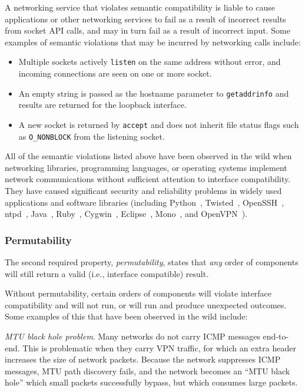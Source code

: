 A networking service that violates semantic
compatibility is liable
to cause applications or other networking services 
to fail as a result of incorrect results from socket API calls, 
and may in turn fail as a result of incorrect input.
Some examples of semantic violations that may be incurred by networking calls include:
\begin{itemize}
    \item Multiple sockets actively {\tt listen} on the same address without error, 
    and incoming connections are seen on one or more socket.
    \item An empty string is passed as the hostname parameter to {\tt getaddrinfo} 
    and results are returned for the loopback interface.
    \item A new socket is returned by {\tt accept} and does not 
    inherit file status flags such as {\tt O\_NONBLOCK} from the listening socket.
\end{itemize}

All of the semantic violations listed above 
have been observed in the wild when networking libraries, 
programming languages, or operating systems
implement network communications without sufficient attention to 
interface compatibility.
They have caused significant 
security and reliability problems in widely used applications and software 
libraries (including 
Python~\cite{CapposPythonBug1,bug13,bug05}, 
Twisted~\cite{bug37}, OpenSSH~\cite{bug15}, ntpd~\cite{bug16}, 
Java~\cite{ipv6-java}, Ruby~\cite{bug19}, 
Cygwin~\cite{bug20}, Eclipse~\cite{bug21}, Mono~\cite{bug33,bug22}, 
and OpenVPN~\cite{bug25}).



\subsubsection{Permutability}

The second required property, \textit{permutability}, states that
\emph{any} order of components will still return a valid
(i.e., interface compatible) result.

Without permutability, certain orders of components 
will violate interface compatibility and will not run,
or will run and produce unexpected outcomes.  Some examples of this 
that have been observed in the wild include:

\emph{MTU black hole problem}. Many networks do not carry ICMP messages end-to-end. 
This is problematic when they carry VPN traffic, for  
which an extra header increases the size of network packets. 
Because the network suppresses ICMP messages, MTU path 
discovery fails, and the network becomes an ``MTU black hole''
which small packets successfully bypass, but which consumes large packets.

